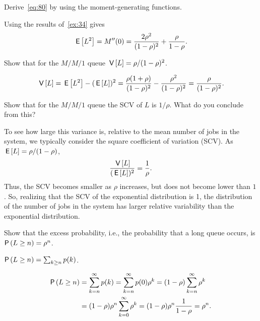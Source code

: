 \begin{extra} Derive~\cref{eq:80} by
  using the moment-generating functions.
\begin{solution}
Using the results of~\cref{ex:34} gives
\begin{equation*}
  \,\mathsf{E}\left[L^2\right]= M''(0)= \frac{2\rho^2}{(1-\rho)^2} + \frac{\rho}{1-\rho}.
\end{equation*}
\end{solution}
\end{extra}

\begin{extra} Show that for the $M/M/1$ queue $\,\mathsf{V}\left[L\right] = \rho/(1-\rho)^2$.
\begin{solution}
\begin{equation*}
\,\mathsf{V}\left[L\right] = \,\mathsf{E}\left[L^2\right] - (\,\mathsf{E}\left[L\right])^2 = \frac{\rho(1+\rho)}{(1-\rho)^2}-\frac{\rho^2}{(1-\rho)^2} = \frac{\rho}{(1-\rho)^2}.
\end{equation*}
\end{solution}
\end{extra}

\begin{extra}
Show that for the $M/M/1$ queue the SCV of $L$ is $1/\rho$. What do you conclude from this?
\begin{solution}
To see how large this variance is, relative to the mean number of jobs
in the system, we typically consider the square coefficient of
variation (SCV). As $\,\mathsf{E}\left[L\right] = \rho/(1-\rho)$,
\begin{equation*}
  \frac{\,\mathsf{V}\left[L\right]}{(\,\mathsf{E}\left[L\right])^2} = \frac 1 \rho.
\end{equation*}
Thus, the SCV becomes smaller as $\rho$ increases, but does not become
lower than $1$. So, realizing that the SCV of the exponential
distribution is 1, the distribution of the number of jobs in the
system has larger relative variability than the exponential
distribution.
\end{solution}
\end{extra}


\begin{extra}
  Show that the excess probability, i.e., the probability that a long queue occurs, is 
$\P{L\geq n} = \rho^n$.
\begin{hint}
$\P{L\geq n} = \sum_{k\geq n} p(k)$.
\end{hint}
\begin{solution}
    \begin{equation*}
      \begin{split}
 \P{L\geq n} 
 &= \sum_{k=n}^\infty p(k) = \sum_{k=n}^\infty p(0)\rho^k = (1-\rho)\sum_{k=n}^\infty \rho^k \\
 &= (1-\rho)\rho^n \sum_{k=0}^\infty\rho^k = (1-\rho) \rho^n \frac1{1-\rho} = \rho^n.
\end{split}
\end{equation*}
\end{solution}
\end{extra}


